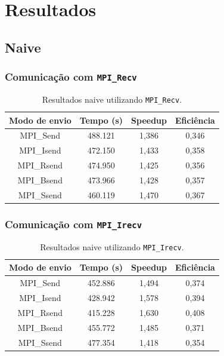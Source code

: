 \documentclass[12pt,a4paper]{article}
\begin{document}
\section{Resultados}
\subsection{Naive}

\subsubsection{Comunicação com \texttt{MPI\_Recv}}
\begin{table}[H]
\centering
\begin{tabular}{|c|c|c|c|}
\hline
\textbf{Modo de envio} & \textbf{Tempo (s)} & \textbf{Speedup} & \textbf{Eficiência} \\
\hline
MPI\_Send & 488.121 & 1,386 & 0,346 \\
\hline
MPI\_Isend & 472.150 & 1,433 & 0,358 \\
\hline
MPI\_Rsend & 474.950 & 1,425 & 0,356 \\
\hline
MPI\_Bsend & 473.966 & 1,428 & 0,357 \\
\hline
MPI\_Ssend & 460.119 & 1,470 & 0,367 \\
\hline
\end{tabular}
\caption{Resultados naive utilizando \texttt{MPI\_Recv}.}
\end{table}

\subsubsection{Comunicação com \texttt{MPI\_Irecv}}
\begin{table}[H]
\centering
\begin{tabular}{|c|c|c|c|}
\hline
\textbf{Modo de envio} & \textbf{Tempo (s)} & \textbf{Speedup} & \textbf{Eficiência} \\
\hline
MPI\_Send & 452.886 & 1,494 & 0,374 \\
\hline
MPI\_Isend & 428.942 & 1,578 & 0,394 \\
\hline
MPI\_Rsend & 415.228 & 1,630 & 0,408 \\
\hline
MPI\_Bsend & 455.772 & 1,485 & 0,371 \\
\hline
MPI\_Ssend & 477.354 & 1,418 & 0,354 \\
\hline
\end{tabular}
\caption{Resultados naive utilizando \texttt{MPI\_Irecv}.}
\end{table}
\end{document}
